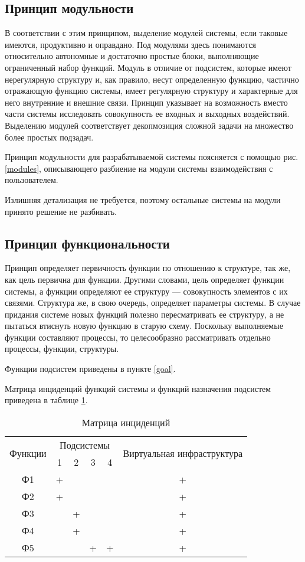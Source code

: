 \subsection{Принцип модульности}

В соответствии с этим принципом, выделение модулей системы, если таковые имеются, продуктивно и оправдано.
Под модулями здесь понимаются относительно автономные и достаточно простые блоки, выполняющие ограниченный набор функций.
Модуль в отличие от подсистем, которые имеют нерегулярную структуру и, как правило, несут определенную функцию, частично отражающую функцию системы, имеет регулярную структуру и характерные для него внутренние и внешние связи.
Принцип указывает на возможность вместо части системы исследовать совокупность ее входных и выходных воздействий.
Выделению модулей соответствует декопмозиция сложной задачи на множество более простых подзадач.

Принцип модульности для разрабатываемой системы поясняется с помощью рис. \ref{modules}, описывающего разбиение на модули системы взаимодействия с пользователем.

Излишняя детализация не требуется, поэтому остальные системы на модули принято решение не разбивать.

\subsection{Принцип функциональности}

Принцип определяет первичность функции по отношению к структуре, так же, как цель первична для функции.
Другими словами, цель определяет функции системы, а функции определяют ее структуру --- совокупность элементов с их связями.
Структура же, в свою очередь, определяет параметры системы.
В случае придания системе новых функций полезно пересматривать ее структуру, а не пытаться втиснуть новую функцию в старую схему.
Поскольку выполняемые функции составляют процессы, то целесообразно рассматривать отдельно процессы, функции, структуры.

Функции подсистем приведены в пункте \ref{goal}.

Матрица инциденций функций системы и функций назначения подсистем приведена в таблице \ref{inc-matrix}.
\begin{table}[H]
  \caption{Матрица инциденций}\label{inc-matrix}
  \begin{tabular}{|c|c|c|c|c|c|}
  \hline \multirow{2}{*}{Функции} & \multicolumn{4}{|c|}{Подсистемы} & \multirow{2}{*}{Виртуальная инфраструктура} \\
  \cline{2-5} & 1 & 2 & 3 & 4 & \\
  \hline Ф1 & + & & & & + \\
  \hline Ф2 & + & & & & + \\
  \hline Ф3 & & + & & & + \\
  \hline Ф4 & & + & & & + \\
  \hline Ф5 & & & + & + & + \\
  \hline 
  \end{tabular}
\end{table}

